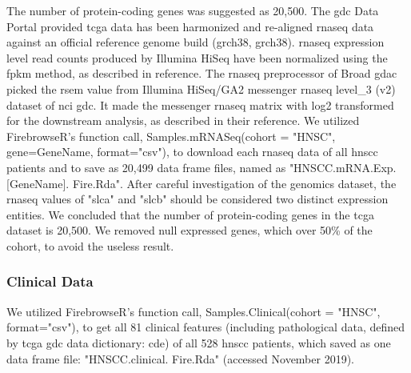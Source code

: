 \documentclass[cancers,article,submit,moreauthors,pdftex]{Definitions/mdpi}
\begin{document}
\begin{paracol}{2}
The number of protein-coding genes was suggested as 20,500\cite{Clamp2007}. The \acrshort{gdc} Data Portal provided \acrshort{tcga} data has been harmonized and re-aligned \acrlong{rnaseq} data against an official reference genome build (\acrlong{grch38}, \acrshort{grch38}). \acrshort{rnaseq} expression level read counts produced by Illumina HiSeq have been normalized using the \acrfull{fpkm} method, as described in reference\cite{FPKM2017}.
The \acrshort{rnaseq} preprocessor of Broad \acrshort{gdac} picked the \acrfull{rsem} value from Illumina HiSeq/GA2 messenger \acrshort{rnaseq} level\_3 (v2) dataset of \acrshort{nci} \acrshort{gdc}. It made the messenger \acrshort{rnaseq} matrix with log2 transformed for the downstream analysis, as described in their reference\cite{RSEM2016}.
We utilized FirebrowseR's function call, Samples.mRNASeq(cohort = "HNSC", gene=GeneName, format="csv"), to download each \acrshort{rnaseq} data of all \acrshort{hnscc} patients and to save as 20,499 data frame files, named as "HNSCC.mRNA.Exp.[GeneName].\newline
Fire.Rda".
After careful investigation of the genomics dataset, the \acrshort{rnaseq} values of "\acrfull{slca}" and "\acrfull{slcb}" should be considered two distinct expression entities. We concluded that the number of protein-coding genes in the \acrshort{tcga} dataset is 20,500. We removed null expressed genes, which over 50\% of the cohort, to avoid the useless result.

\subsubsection*{Clinical Data} 

We utilized FirebrowseR's function call, Samples.Clinical(cohort = "HNSC", format="csv"), to get all 81 clinical features (including pathological data, defined by \acrshort{tcga} \acrshort{gdc} data dictionary: \acrfull{cde}\cite{CDE2019}) of all 528 \acrshort{hnscc} patients, which saved as one data frame file: "HNSCC.clinical.\linebreak
Fire.Rda" (accessed November 2019).


\end{paracol}
\end{document}

